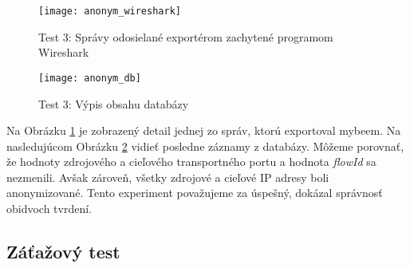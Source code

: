 \begin{figure}[ht!]
\centering
\texttt{[image: anonym\_wireshark]}
\caption{Test 3: Správy odosielané exportérom zachytené programom Wireshark}\label{o:anonym_wireshark}
\end{figure}

\begin{figure}[ht!]
\centering
\texttt{[image: anonym\_db]}
\caption{Test 3: Výpis obsahu databázy}\label{o:anonym_db}
\end{figure}


Na Obrázku \ref{o:anonym_wireshark} je zobrazený detail jednej zo správ, ktorú exportoval mybeem. 
Na nasledujúcom Obrázku \ref{o:anonym_db} vidieť posledne záznamy z databázy. Môžeme porovnať, že hodnoty 
zdrojového a cieľového transportného portu a hodnota \emph{flowId} sa nezmenili. Avšak zároveň, všetky 
zdrojové a cieľové IP adresy boli anonymizované. Tento experiment považujeme za úspešný, dokázal správnosť 
obidvoch tvrdení.


\subsection{Záťažový test}





